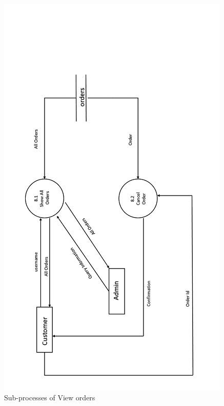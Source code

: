 \begin{figure}
 \centering
\includegraphics{figures/8final.png}
\caption{Sub-processes of View orders}
\end{figure}



